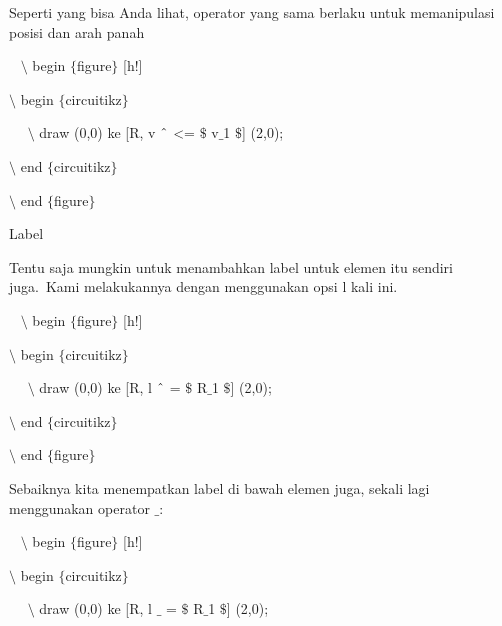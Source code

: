 \noindent 
Seperti yang bisa Anda lihat, operator yang sama berlaku untuk memanipulasi posisi dan arah panah
\par


\noindent 
~ $\setminus$ begin $ \{ $figure$ \} $ [h!]
\par


\noindent 
 $\setminus$ begin $ \{ $circuitikz$ \} $
\par


\noindent 
~~ $\setminus$ draw (0,0) ke [R, v $ \string^ $ <= $\$$ v$ \_ $1 $\$$] (2,0);
\par


\noindent 
 $\setminus$ end $ \{ $circuitikz$ \} $
\par


\noindent 
 $\setminus$ end $ \{ $figure$ \} $ 
\par


\noindent 
Label
\par


\noindent 
Tentu saja mungkin untuk menambahkan label untuk elemen itu sendiri juga. Kami melakukannya dengan menggunakan opsi l kali ini.
\par


\noindent 
~ $\setminus$ begin $ \{ $figure$ \} $ [h!]
\par


\noindent 
 $\setminus$ begin $ \{ $circuitikz$ \} $
\par


\noindent 
~~ $\setminus$ draw (0,0) ke [R, l $ \string^ $ = $\$$ R$ \_ $1 $\$$] (2,0);
\par


\noindent 
 $\setminus$ end $ \{ $circuitikz$ \} $
\par


\noindent 
 $\setminus$ end $ \{ $figure$ \} $ 
\par


\noindent 
Sebaiknya kita menempatkan label di bawah elemen juga, sekali lagi menggunakan operator $ \_ $:
\par


\noindent 
~ $\setminus$ begin $ \{ $figure$ \} $ [h!]
\par


\noindent 
 $\setminus$ begin $ \{ $circuitikz$ \} $
\par


\noindent 
~~ $\setminus$ draw (0,0) ke [R, l $ \_ $ = $\$$ R$ \_ $1 $\$$] (2,0);
\par


